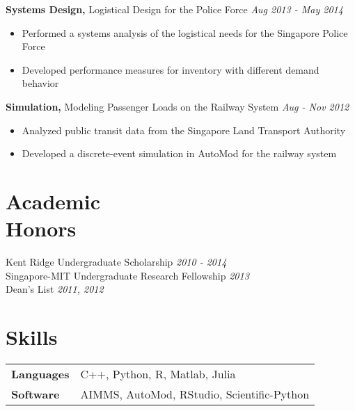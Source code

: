 \documentclass[margin]{res}
\begin{document}
\begin{resume}
{\bf Systems Design,} Logistical Design for the Police Force \hfill \textit{Aug 2013 - May 2014}
\begin{itemize} \itemsep -2pt
\item Performed a systems analysis of the logistical needs for the Singapore Police Force
\item Developed performance measures for inventory with different demand behavior
\end{itemize}

{\bf Simulation,} Modeling Passenger Loads on the Railway System \hfill \textit{Aug - Nov 2012}
\begin{itemize} \itemsep -2pt
\item Analyzed public transit data from the Singapore Land Transport Authority
\item Developed a discrete-event simulation in AutoMod for the railway system
\end{itemize}

\section{Academic \\ Honors}
Kent Ridge Undergraduate Scholarship \hfill \textit{2010 - 2014} \\
Singapore-MIT Undergraduate Research Fellowship \hfill \textit{2013} \\
Dean's List \hfill \textit{2011, 2012}

\section{Skills}
\begin{tabular}{l p{3in}}
\bf{Languages} & C++, Python, R, Matlab, Julia \\
\bf{Software} & AIMMS, AutoMod, RStudio, Scientific-Python
\end{tabular}

\end{resume} 
\end{document}
